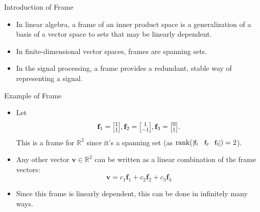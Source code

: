 \documentclass{beamer}
\newcommand{\RR}{\mathbb{R}}
\renewcommand{\vec}[1]{\mathbf{#1}}
\newcommand{\ivec}[2][.8]{%
  \scalebox{#1}{%
    \renewcommand{\arraystretch}{.8}%
    $\begin{bmatrix}#2\end{bmatrix}$%
  }
}
\begin{document}
\begin{frame}{Introduction of Frame}
  \begin{itemize}
    
    \item In linear algebra, a frame of an inner product space is a generalization of a basis of a vector space to sets that may be linearly dependent.\cite{kovavcevic2008introduction}
    
    \item In finite-dimensional vector spaces, frames are spanning sets.
    \item In the signal processing, a frame provides a redundant, stable way of representing a signal.\cite{goyal2001quantized}
    
  \end{itemize}
\end{frame}

\begin{frame}{Example of Frame}
  \begin{itemize}
    \item <1-> Let
    \[
        \vec{f}_1 = \ivec{1\\1}, \vec{f}_2 = \ivec{1\\-1}, \vec{f}_3 = \ivec{0\\1}.
    \]
    This is a frame for $\RR^2$ since it's a spanning set (as $\operatorname{rank}(\ivec{\vec{f}_1 & \vec{f}_2 & \vec{f}_3}) = 2$).

    \item <2-> Any other vector $\vec{v}\in\RR^2$ can be written as a linear combination of the frame vectors:
    \[
        \vec{v} = c_1\vec{f}_1 + c_2\vec{f}_2 + c_3\vec{f}_3
    \]

    \item <3-> Since this frame is linearly dependent, this can be done in infinitely many ways.
  \end{itemize}
\end{frame}
\end{document}
